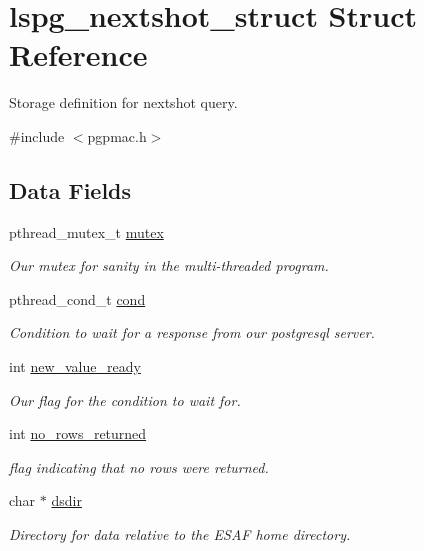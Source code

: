 \hypertarget{structlspg__nextshot__struct}{\section{lspg\-\_\-nextshot\-\_\-struct Struct Reference}
\label{structlspg__nextshot__struct}
}


Storage definition for nextshot query.  




{\ttfamily \#include $<$pgpmac.\-h$>$}

\subsection*{Data Fields}
\begin{DoxyCompactItemize}
\item 
pthread\-\_\-mutex\-\_\-t \hyperlink{structlspg__nextshot__struct_a38b657155fbee9b73278f76912cf2333}{mutex}
\begin{DoxyCompactList}\small\item\em Our mutex for sanity in the multi-\/threaded program. \end{DoxyCompactList}\item 
pthread\-\_\-cond\-\_\-t \hyperlink{structlspg__nextshot__struct_afc773a9eefc173aa98d5c2889e1d7669}{cond}
\begin{DoxyCompactList}\small\item\em Condition to wait for a response from our postgresql server. \end{DoxyCompactList}\item 
int \hyperlink{structlspg__nextshot__struct_adb8da14444b98f556dba9420dd4666dc}{new\-\_\-value\-\_\-ready}
\begin{DoxyCompactList}\small\item\em Our flag for the condition to wait for. \end{DoxyCompactList}\item 
int \hyperlink{structlspg__nextshot__struct_abc9242805729f70b83df79706c394c71}{no\-\_\-rows\-\_\-returned}
\begin{DoxyCompactList}\small\item\em flag indicating that no rows were returned. \end{DoxyCompactList}\item 
char $\ast$ \hyperlink{structlspg__nextshot__struct_ac372e1774a25b3d4bfbb9169762eb39e}{dsdir}
\begin{DoxyCompactList}\small\item\em Directory for data relative to the E\-S\-A\-F home directory. \end{DoxyCompactList}\item 

\end{DoxyCompactItemize}
